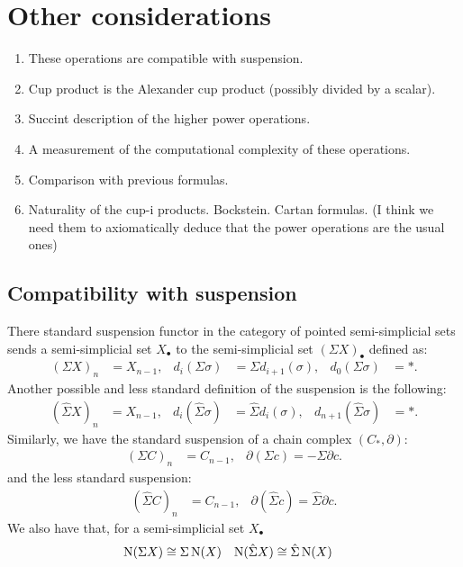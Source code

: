 
\section{Other considerations}

\begin{enumerate}
	\item These operations are compatible with suspension.
	\item Cup product is the Alexander cup product (possibly divided by a scalar).
	\item Succint description of the higher power operations.
	\item A measurement of the computational complexity of these operations.
	\item Comparison with previous formulas.
	\item Naturality of the cup-i products. Bockstein. Cartan formulas. (I think we need them to axiomatically deduce that the power operations are the usual ones)
\end{enumerate}

\subsection{Compatibility with suspension}

There standard suspension functor in the category of pointed semi-simplicial sets sends a semi-simplicial set $X_\bullet$ to the semi-simplicial set $(\Sigma X)_\bullet$ defined as:
\begin{align*}
    (\Sigma X)_n &= X_{n-1},& d_i(\Sigma\sigma) &= \Sigma d_{i+1}(\sigma),& d_{0}(\Sigma \sigma) &= *.
\end{align*}
Another possible and less standard definition of the suspension is the following:
\begin{align*}
    (\hat{\Sigma} X)_n &= X_{n-1}, &d_i(\hat{\Sigma}\sigma) &= \hat{\Sigma} d_i(\sigma),& d_{n+1}(\hat{\Sigma} \sigma) &= *.
\end{align*}
Similarly, we have the standard suspension of a chain complex $(C_*,\partial)$:
\begin{align*}
    (\Sigma C)_n &= C_{n-1}, & \partial (\Sigma c) = -\Sigma \partial c.
\end{align*}
and the less standard suspension:
\begin{align*}
    (\hat{\Sigma} C)_n &= C_{n-1}, & \partial (\hat{\Sigma} c) = \hat{\Sigma} \partial c.
\end{align*}
We also have that, for a semi-simplicial set $X_\bullet$ \begin{align*}
    \operatorname{N}(\Sigma X)&\cong \Sigma \operatorname{N}(X) & \operatorname{N}(\hat{\Sigma}X) &\cong \hat{\Sigma}\operatorname{N}(X)
\end{align*}


